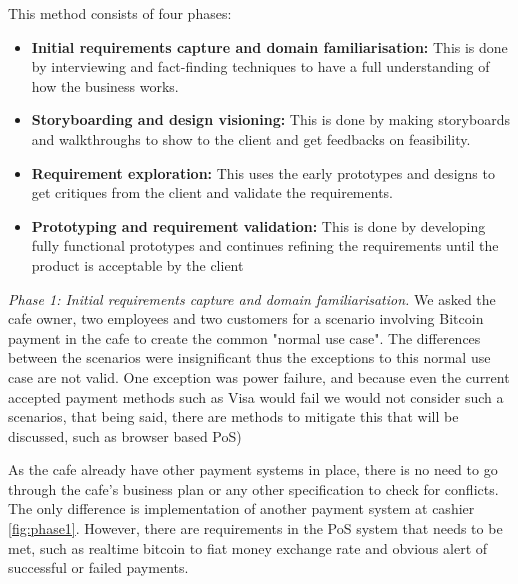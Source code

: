 This method consists of four phases:
\begin{itemize}

\item \textbf{Initial requirements capture and domain familiarisation: } This is done by interviewing and fact-finding techniques to have a full understanding of how the business works.

\item \textbf{Storyboarding and design visioning: } This is done by making storyboards and walkthroughs to show to the client and get feedbacks on feasibility.

\item \textbf{Requirement exploration: } This uses the early prototypes  and designs to get critiques from the client and validate the requirements.

\item \textbf{Prototyping and requirement validation: } This is done by developing fully functional prototypes and continues refining the requirements until the product is acceptable by the client

\end{itemize}

\textit{Phase 1: Initial requirements capture and domain familiarisation.} We asked the cafe owner, two employees and two customers for a scenario involving Bitcoin payment in the cafe to create the common "normal use case". The differences between the scenarios were insignificant thus the exceptions to this normal use case are not valid. One exception was power failure, and because even the current accepted payment methods such as Visa would fail we would not consider such a scenarios, that being said, there are methods to mitigate this that will be discussed, such as browser based PoS)


As the cafe already have other payment systems in place, there is no need to go through the cafe's business plan or any other specification to check for conflicts. The only difference is implementation of another payment system at cashier \ref{fig:phase1}.
However, there are requirements in the PoS system that needs to be met, such as realtime bitcoin to fiat money exchange rate and obvious alert of successful or failed payments.

